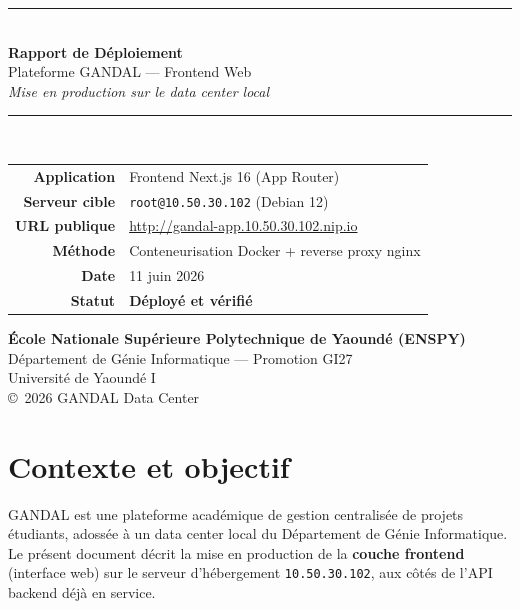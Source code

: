 \documentclass[11pt,a4paper]{article}
\newcommand{\statut}[1]{\textcolor{okgreen}{\textbf{#1}}}
\begin{document}
\begin{titlepage}
\centering
\vspace*{2cm}
{\color{gandalblue}\rule{\linewidth}{1.5pt}}\\[0.6cm]
{\Huge\bfseries\color{gandalblue} Rapport de Déploiement}\\[0.4cm]
{\LARGE Plateforme GANDAL — Frontend Web}\\[0.3cm]
{\large\itshape Mise en production sur le data center local}\\[0.4cm]
{\color{gandalblue}\rule{\linewidth}{1.5pt}}\\[1.5cm]

\begin{tabular}{rl}
\textbf{Application}     & Frontend Next.js 16 (App Router)\\[4pt]
\textbf{Serveur cible}   & \texttt{root@10.50.30.102} (Debian 12)\\[4pt]
\textbf{URL publique}    & \url{http://gandal-app.10.50.30.102.nip.io}\\[4pt]
\textbf{Méthode}         & Conteneurisation Docker + reverse proxy nginx\\[4pt]
\textbf{Date}            & 11 juin 2026\\[4pt]
\textbf{Statut}          & \statut{Déployé et vérifié}\\
\end{tabular}

\vfill
{\large\textbf{École Nationale Supérieure Polytechnique de Yaoundé (ENSPY)}}\\[0.2cm]
{Département de Génie Informatique — Promotion GI27}\\[0.2cm]
{Université de Yaoundé I}\\[1cm]
{\small \copyright\ 2026 GANDAL Data Center}
\end{titlepage}

\tableofcontents
\thispagestyle{fancy}
\newpage

\section{Contexte et objectif}

GANDAL est une plateforme académique de gestion centralisée de projets étudiants,
adossée à un data center local du Département de Génie Informatique. Le présent
document décrit la mise en production de la \textbf{couche frontend} (interface web)
sur le serveur d'hébergement \texttt{10.50.30.102}, aux côtés de l'API backend déjà
en service.
\end{document}
